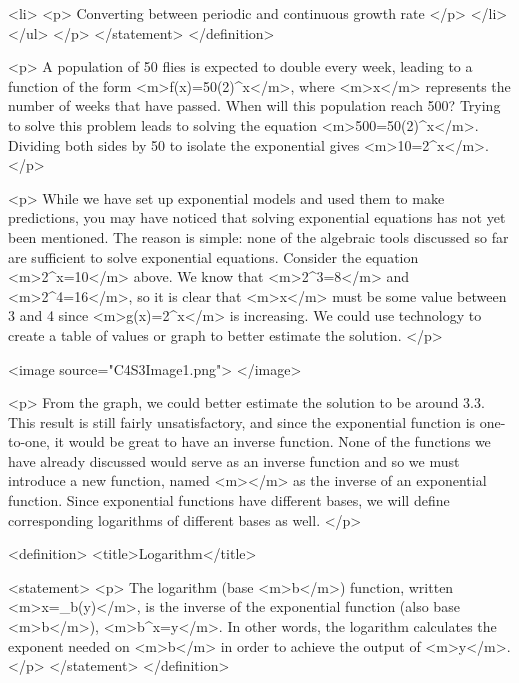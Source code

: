                         <li>
                            <p>
                                Converting between periodic and continuous growth rate
                            </p>
                        </li>
                    </ul>
                </p>
            </statement>
        </definition>

        <p>
            A population of 50 flies is expected to double every week, leading to a function of the form <m>f(x)=50(2)^{x}</m>, where <m>x</m> represents the number of weeks that have passed.
            When will this population reach 500? Trying to solve this problem leads to solving the equation <m>500=50(2)^{x}</m>.
            Dividing both sides by 50 to isolate the exponential gives <m>10=2^{x}</m>.
        </p>

        <p>
            While we have set up exponential models and used them to make predictions, you may have noticed that solving exponential equations has not yet been mentioned.
            The reason is simple: none of the algebraic tools discussed so far are sufficient to solve exponential equations.
            Consider the equation <m>2^{x}=10</m> above.
            We know that <m>2^{3}=8</m> and <m>2^{4}=16</m>, so it is clear that <m>x</m> must be some value between 3 and 4 since <m>g(x)=2^{x}</m> is increasing.
            We could use technology to create a table of values or graph to better estimate the solution.
        </p>

        <image source="C4S3Image1.png">
        </image>

        <p>
            From the graph, we could better estimate the solution to be around 3.3.
            This result is still fairly unsatisfactory, and since the exponential function is one-to-one, it would be great to have an inverse function.
            None of the functions we have already discussed would serve as an inverse function and so we must introduce a new function, named <m>\log</m> as the inverse of an exponential function.
            Since exponential functions have different bases, we will define corresponding logarithms of different bases as well.
        </p>

        <definition>
            <title>Logarithm</title>

            <statement>
                <p>
                    The logarithm (base <m>b</m>) function, written <m>x=\log_{b}⁡(y)</m>, is the inverse of the exponential function (also base <m>b</m>), <m>b^{x}=y</m>.
                    In other words, the logarithm calculates the exponent needed on <m>b</m> in order to achieve the output of <m>y</m>.
                </p>
            </statement>
        </definition>

